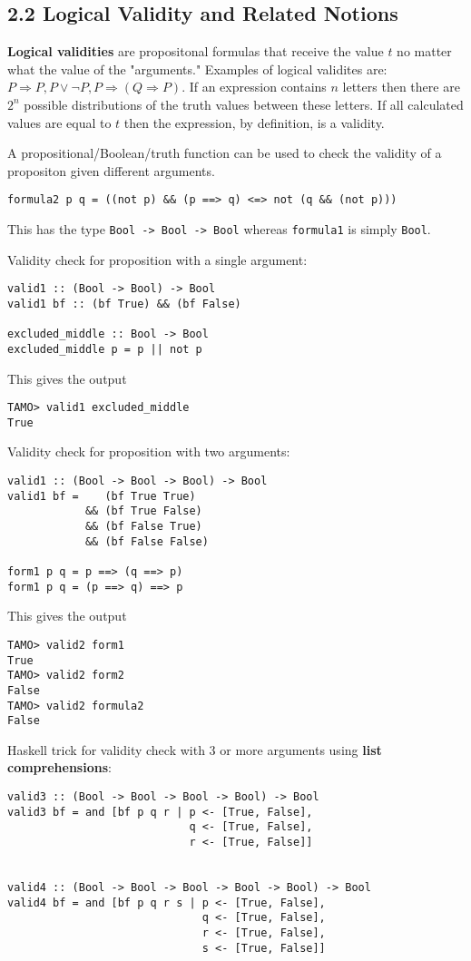 \documentclass[11pt]{article}
\begin{document}
\subsection*{2.2 Logical Validity and Related Notions}

\textbf{Logical validities} are propositonal formulas that receive the value $t$ no matter what the value of the "arguments." Examples of logical validites are: $P \Rightarrow P, P \lor \lnot P, P \Rightarrow (Q \Rightarrow P)$.
If an expression contains $n$ letters then there are $2^n$ possible distributions of the truth values between these letters. If all calculated values are equal to $t$ then the expression, by definition, is a validity.

A propositional/Boolean/truth function can be used to check the validity of a propositon given different arguments. 

\begin{verbatim}
formula2 p q = ((not p) && (p ==> q) <=> not (q && (not p)))
\end{verbatim}

This has the type \texttt{Bool -> Bool -> Bool} whereas \texttt{formula1} is simply \texttt{Bool}.

Validity check for proposition with a single argument:
\begin{verbatim}
valid1 :: (Bool -> Bool) -> Bool
valid1 bf :: (bf True) && (bf False)

excluded_middle :: Bool -> Bool
excluded_middle p = p || not p
\end{verbatim}
This gives the output
\begin{verbatim}
TAMO> valid1 excluded_middle
True
\end{verbatim}

Validity check for proposition with two arguments:
\begin{verbatim}
valid1 :: (Bool -> Bool -> Bool) -> Bool
valid1 bf =    (bf True True) 
            && (bf True False)
            && (bf False True)
            && (bf False False)
            
form1 p q = p ==> (q ==> p)
form1 p q = (p ==> q) ==> p
\end{verbatim}
This gives the output
\begin{verbatim}
TAMO> valid2 form1
True
TAMO> valid2 form2
False
TAMO> valid2 formula2
False
\end{verbatim}

Haskell trick for validity check with 3 or more arguments using \textbf{list comprehensions}:
\begin{verbatim}
valid3 :: (Bool -> Bool -> Bool -> Bool) -> Bool
valid3 bf = and [bf p q r | p <- [True, False],
                            q <- [True, False],
                            r <- [True, False]]
                            
                            
valid4 :: (Bool -> Bool -> Bool -> Bool -> Bool) -> Bool
valid4 bf = and [bf p q r s | p <- [True, False],
                              q <- [True, False],
                              r <- [True, False],
                              s <- [True, False]]
\end{verbatim}
\end{document}
